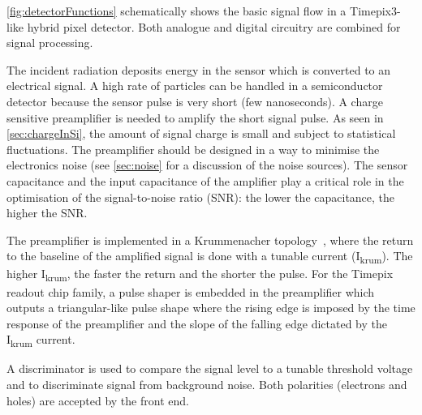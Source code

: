 \cref{fig:detectorFunctions} schematically shows the basic signal flow
in a Timepix3-like hybrid pixel detector. Both analogue and digital
circuitry are combined for signal processing.

The incident radiation deposits energy in the sensor which is
converted to an electrical signal. A high rate of particles can be
handled in a semiconductor detector because the sensor pulse is very
short (few nanoseconds). A charge sensitive preamplifier is needed to
amplify the short signal pulse. As seen in \cref{sec:chargeInSi}, the
amount of signal charge is small and subject to statistical
fluctuations. The preamplifier should be designed in a way to minimise
the electronics noise (see \cref{sec:noise} for a discussion of the
noise sources). The sensor capacitance and the input capacitance of
the amplifier play a critical role in the optimisation of the
signal-to-noise ratio (SNR): the lower the capacitance, the higher the
SNR.

The preamplifier is implemented in a Krummenacher
topology~\cite{KRUMMENACHER1991527}, where the return to the baseline
of the amplified signal is done with a tunable current
(I\textsubscript{krum}). The higher I\textsubscript{krum}, the faster
the return and the shorter the pulse. For the Timepix readout chip
family, a pulse shaper is embedded in the preamplifier which outputs a
triangular-like pulse shape where the rising edge is imposed by the
time response of the preamplifier and the slope of the falling edge
dictated by the I\textsubscript{krum} current.


A discriminator is used to compare the signal level to a tunable
threshold voltage and to discriminate signal from background
noise. Both polarities (electrons and holes) are accepted by the front
end.

